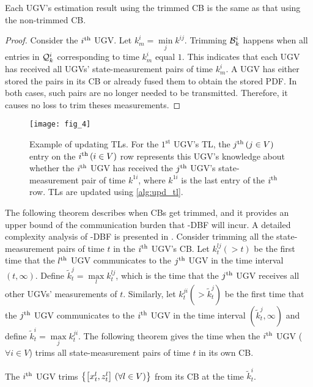 	\begin{thm}\label{thm:trim_no_loss}
		Each UGV's estimation result using the trimmed CB is the same as that using the non-trimmed CB.
	\end{thm}
	
	\begin{proof}
		
		Consider the $i^\text{th}$ UGV. Let $k^i_m=\min\limits_j k^{ij}$. 
		Trimming $\mathcal{B}^i_k$ happens when all entries in $\mathcal{Q}^i_k$ corresponding to time $k^i_m$ equal $1$. 
		This indicates that each UGV has received all UGVs' state-measurement pairs of time $k^i_m$.
		A UGV has either stored the pairs in its CB or already fused them to obtain the stored PDF.
		In both cases, such pairs are no longer needed to be transmitted. %
		Therefore, it causes no loss to trim theses measurements.		
	\end{proof}
	
	\begin{figure}%
		\centering
		\texttt{[image: fig\_4]}
		\caption{Example of updating TLs. For the $1^\text{st}$ UGV's TL, the $j^\text{th}\,(j\in V)$ entry on the $i^\text{th}\,(i\in V)$ row represents this UGV's knowledge about whether the $i^\text{th}$ UGV has received the $j^\text{th}$ UGV's state-measurement pair of time $k^{1i}$, where $k^{1i}$ is the last entry of the $i^\text{th}$ row. TLs are updated using \cref{alg:upd_tl}.}
		\label{fig:upd_tl}
	\end{figure}
	
	\textcolor{\revcol}{The following theorem describes when CBs get trimmed, and it provides an upper bound of the communication burden that \proto-DBF will incur.
	A detailed complexity analysis of \proto-DBF is presented in .}
	Consider trimming all the state-measurement pairs of time $t$ in the $i^\text{th}$ UGV's CB.
	Let $k^{lj}_t (>t)$ be the first time that the $l^\text{th}$ UGV communicates to the $j^\text{th}$ UGV in the time interval $(t,\infty)$.
	Define $\tilde{k}^j_t=\max\limits_l k^{lj}_t$, which is the time that the $j^\text{th}$ UGV receives all other UGVs' measurements of $t$.
	Similarly, let $k^{ji}_t (> \tilde{k}^j_t)$ be the first time that the $j^\text{th}$ UGV communicates to the $i^\text{th}$ UGV in the time interval $(\tilde{k}^j_t,\infty)$ and define $\tilde{k}^i_t=\max\limits_j k^{ji}_t$.
	The following theorem gives the time when the $i^\text{th}$ UGV ($\forall i\in V$) trims all state-measurement pairs of time $t$ in its own CB.
	\begin{thm}\label{thm:upd_tl_freq}		
		The $i^\text{th}$ UGV trims $\left\lbrace\left[x^l_t,z^l_t\right] \,(\forall l\in V)\right\rbrace$ from its CB at the time $\tilde{k}^i_t$.
	\end{thm}
	
